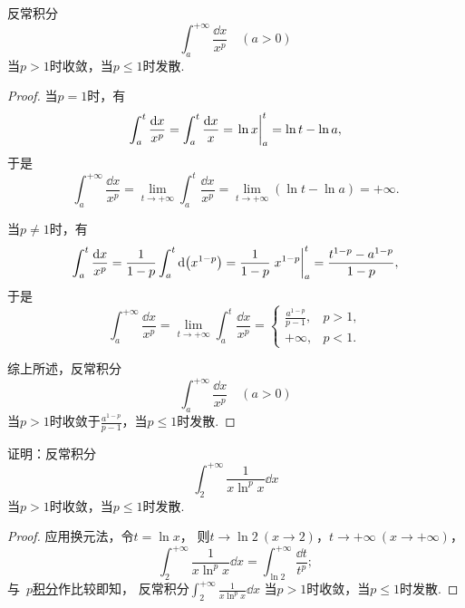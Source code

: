 \begin{proposition}[\(p\)积分]\label{example:定积分.p积分}
反常积分\[
	\int_a^{+\infty} \frac{\dd{x}}{x^p}
	\quad(a>0)
\]当\(p>1\)时收敛，当\(p\leq1\)时发散.
\begin{proof}
当\(p=1\)时，有\[
	\int_a^t \frac{\dd{x}}{x^p}
	= \int_a^t \frac{\dd{x}}{x}
	= \eval{\ln x}_a^t
	= \ln t - \ln a,
\]
于是\[
	\int_a^{+\infty} \frac{\dd{x}}{x^p}
	= \lim_{t\to+\infty} \int_a^t \frac{\dd{x}}{x^p}
	= \lim_{t\to+\infty} (\ln t - \ln a)
	= +\infty.
\]

当\(p\neq1\)时，有\[
	\int_a^t \frac{\dd{x}}{x^p}
	= \frac{1}{1-p} \int_a^t \dd(x^{1-p})
	= \frac{1}{1-p} \eval{x^{1-p}}_a^t
	= \frac{t^{1-p}-a^{1-p}}{1-p},
\]
于是\[
	\int_a^{+\infty} \frac{\dd{x}}{x^p}
	= \lim_{t\to+\infty} \int_a^t \frac{\dd{x}}{x^p}
	= \left\{ \begin{array}{cl}
		\frac{a^{1-p}}{p-1}, & p>1, \\
		+\infty, & p<1.
	\end{array} \right.
\]

综上所述，反常积分\[
	\int_a^{+\infty} \frac{\dd{x}}{x^p}
	\quad(a>0)
\]当\(p>1\)时收敛于\(\frac{a^{1-p}}{p-1}\)，当\(p\leq1\)时发散.
\end{proof}
\end{proposition}

\begin{example}
证明：反常积分\[
	\int_2^{+\infty} \frac{1}{x \ln^p x} \dd{x}
\]
当\(p>1\)时收敛，当\(p\leq1\)时发散.
\begin{proof}
应用换元法，令\(t = \ln x\)，
则\(t \to \ln2\ (x\to2)\)，\(t \to +\infty\ (x\to+\infty)\)，
\[
	\int_2^{+\infty} \frac{1}{x \ln^p x} \dd{x}
	= \int_{\ln2}^{+\infty} \frac{\dd{t}}{t^p};
\]
与~\hyperref[example:定积分.p积分]{\(p\)积分}作比较即知，
反常积分\(\int_2^{+\infty} \frac{1}{x \ln^p x} \dd{x}\)%
当\(p>1\)时收敛，当\(p\leq1\)时发散.
\end{proof}
\end{example}

